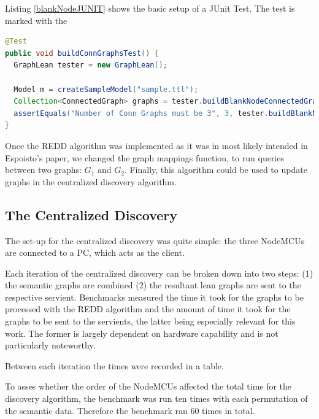Listing \ref{blankNodeJUNIT} shows the basic setup of a JUnit Test. The test is marked with the 

\begin{lstlisting}[language=JAVA, caption={A very trivial test, that checks the correct number of connected graphs in a sample graph is three.}, label={blankNodeJUNIT}]
@Test
public void buildConnGraphsTest() {
  GraphLean tester = new GraphLean();

  Model m = createSampleModel("sample.ttl");
  Collection<ConnectedGraph> graphs = tester.buildBlankNodeConnectedGraphs(m);
  assertEquals("Number of Conn Graphs must be 3", 3, tester.buildBlankNodeConnectedGraphs(m).size());
}
\end{lstlisting}

Once the REDD algorithm was implemented as it was in most likely intended in Espoisto's paper, we changed the graph mappings function, to run queries between two graphs: $G_1$ and $G_2$. Finally, this algorithm could be used to update graphs in the centralized discovery algorithm.

\subsection{The Centralized Discovery}

The set-up for the centralized discovery was quite simple: the three NodeMCUs are connected to a PC, which acts as the client.

Each iteration of the centralized discovery can be broken down into two steps: (1) the semantic graphs are combined (2) the resultant lean graphs are sent to the respective servient. Benchmarks measured the time it took for the graphs to be processed with the REDD algorithm and the amount of time it took for the graphs to be sent to the servients, the latter being especially relevant for this work. The former is largely dependent on hardware capability and is not particularly noteworthy.



Between each iteration the times were recorded in a table. 


To asses whether the order of the NodeMCUs affected the total time for the discovery algorithm, the benchmark was run ten times with each permutation of the semantic data. Therefore the benchmark ran 60 times in total.



